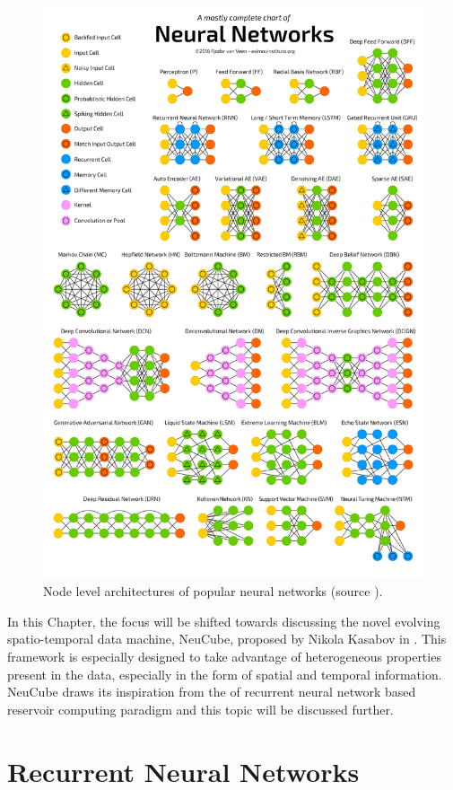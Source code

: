 \begin{figure}
	\centering
	\includegraphics[width=0.8\linewidth]{fig/neucube/arch_comp.png}
	\caption{Node level architectures of popular neural networks (source \citet{neuralnetworkzoo}).}
	\label{fig:neural_network_archs}
\end{figure}

In this Chapter, the focus will be shifted towards discussing the novel evolving spatio-temporal data machine, NeuCube, proposed by Nikola Kasabov in \citep{kasabov2012neucube}. This framework is especially designed to take advantage of heterogeneous properties present in the data, especially in the form of spatial and temporal information. NeuCube draws its inspiration from the of recurrent neural network based reservoir computing paradigm and this topic will be discussed further. 

\section{Recurrent Neural Networks}

